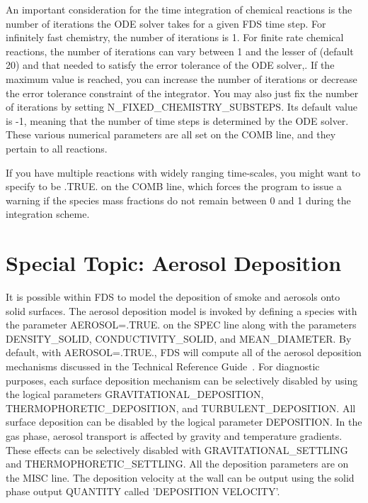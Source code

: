 \documentclass[11pt]{book}
\begin{document}
An important consideration for the time integration of chemical reactions is the number of iterations the ODE solver takes for a given FDS time step. For infinitely fast chemistry, the number of iterations is 1. For finite rate chemical reactions, the number of iterations can vary between 1 and the lesser of (default 20) and that needed to satisfy the error tolerance of the ODE solver,. If the maximum value is reached, you can increase the number of iterations or decrease the error tolerance constraint of the integrator. You may also just fix the number of iterations by setting {\ct N\_FIXED\_CHEMISTRY\_SUBSTEPS}. Its default value is -1, meaning that the number of time steps is determined by the ODE solver. These various numerical parameters are all set on the {\ct COMB} line, and they pertain to all reactions.

If you have multiple reactions with widely ranging time-scales, you might want to specify  to be {\ct .TRUE.} on the {\ct COMB} line, which forces the program to issue a warning if the species mass fractions do not remain between 0 and 1 during the integration scheme.



\newpage

\section{Special Topic: Aerosol Deposition}
\label{info:deposition}

It is possible within FDS to model the deposition of smoke and aerosols onto solid surfaces. The aerosol deposition model is invoked by defining a species with the parameter {\ct AEROSOL=.TRUE.} on the {\ct SPEC} line along with the parameters {\ct DENSITY\_SOLID}, {\ct CONDUCTIVITY\_SOLID}, and {\ct MEAN\_DIAMETER}. By default, with {\ct AEROSOL=.TRUE.}, FDS will compute all of the aerosol deposition mechanisms discussed in the Technical Reference Guide~\cite{FDS_Math_Guide}. For diagnostic purposes, each surface deposition mechanism can be selectively disabled by using the logical parameters {\ct GRAVITATIONAL\_DEPOSITION}, {\ct THERMOPHORETIC\_DEPOSITION}, and {\ct TURBULENT\_DEPOSITION}. All surface deposition can be disabled by the logical parameter {\ct DEPOSITION}. In the gas phase, aerosol transport is affected by gravity and temperature gradients. These effects can be selectively disabled with {\ct GRAVITATIONAL\_SETTLING} and {\ct THERMOPHORETIC\_SETTLING}. All the deposition parameters are on the {\ct MISC} line.  The deposition velocity at the wall can be output using the solid phase output {\ct QUANTITY} called {\ct 'DEPOSITION VELOCITY'}.
\end{document}
